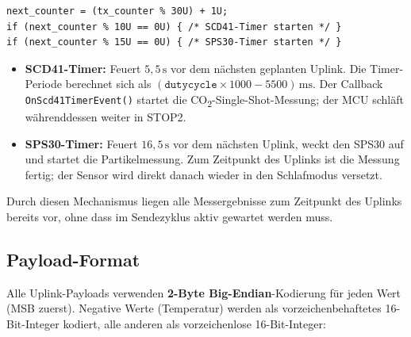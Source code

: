 \begin{verbatim}
next_counter = (tx_counter % 30U) + 1U;
if (next_counter % 10U == 0U) { /* SCD41-Timer starten */ }
if (next_counter % 15U == 0U) { /* SPS30-Timer starten */ }
\end{verbatim}

\begin{itemize}
  \item \textbf{SCD41-Timer:} Feuert $5{,}5\,\text{s}$ vor dem nächsten geplanten Uplink. Die Timer-Periode berechnet sich als $(\texttt{dutycycle} \times 1000 - 5500)\,\text{ms}$. Der Callback \texttt{OnScd41TimerEvent()} startet die CO\textsubscript{2}-Single-Shot-Messung; der MCU schläft währenddessen weiter in STOP2.
  \item \textbf{SPS30-Timer:} Feuert $16{,}5\,\text{s}$ vor dem nächsten Uplink, weckt den SPS30 auf und startet die Partikelmessung. Zum Zeitpunkt des Uplinks ist die Messung fertig; der Sensor wird direkt danach wieder in den Schlafmodus versetzt.
\end{itemize}

Durch diesen Mechanismus liegen alle Messergebnisse zum Zeitpunkt des Uplinks bereits vor, ohne dass im Sendezyklus aktiv gewartet werden muss.

\subsection*{Payload-Format}

Alle Uplink-Payloads verwenden \textbf{2-Byte Big-Endian}-Kodierung für jeden Wert (MSB zuerst). Negative Werte (Temperatur) werden als vorzeichenbehaftetes 16-Bit-Integer kodiert, alle anderen als vorzeichenlose 16-Bit-Integer:


